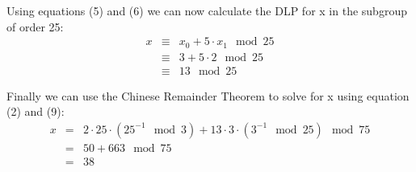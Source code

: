 Using equations (5) and (6) we can now calculate the DLP for x in the subgroup of order 25:
\begin{eqnarray}
    x &\equiv& x_{0} + 5 \cdot x_{1} \mod 25\\
    &\equiv& 3 + 5 \cdot 2 \mod 25 \\
    &\equiv& 13 \mod 25
\end{eqnarray}

Finally we can use the Chinese Remainder Theorem to solve for x using equation (2) and (9):
\begin{eqnarray*}
    x &=& 2 \cdot 25 \cdot (25^{-1} \mod 3) + 13 \cdot 3 \cdot (3^{-1} \mod 25) \mod 75 \\
    &=& 50 + 663 \mod 75 \\
    &=& 38
\end{eqnarray*}